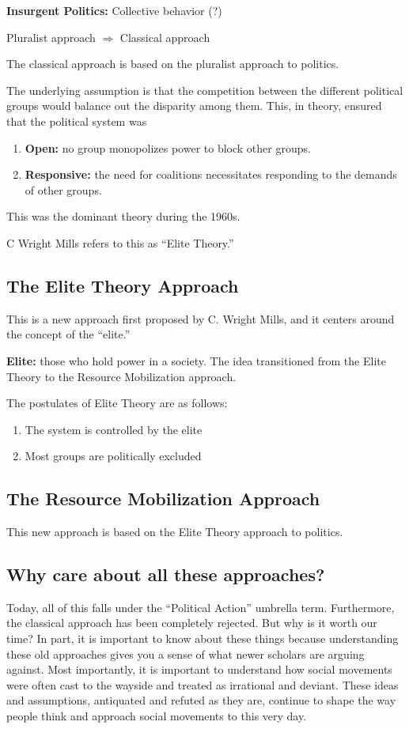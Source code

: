 \noindent \textbf{Insurgent Politics:} Collective behavior (?)

Pluralist approach $\Rightarrow$ Classical approach

The classical approach is based on the pluralist approach to politics.


The underlying assumption is that the competition between the different political groups would balance out the disparity among them.
This, in theory, ensured that the political system was
\begin{enumerate}
    \item \textbf{Open:} no group monopolizes power to block other groups.
    \item \textbf{Responsive:} the need for coalitions necessitates responding to the demands of other groups.
\end{enumerate}

This was the dominant theory during the 1960s.

C Wright Mills refers to this as ``Elite Theory.''

\subsection{The Elite Theory Approach}
This is a new approach first proposed by C. Wright Mills, and it centers around the concept of the ``elite.''

\noindent \textbf{Elite:} those who hold power in a society.
The idea transitioned from the Elite Theory to the Resource Mobilization approach.

The postulates of Elite Theory are as follows:
\begin{enumerate}
    \item The system is controlled by the elite
    \item Most groups are politically excluded
\end{enumerate}

\subsection{The Resource Mobilization Approach}
This new approach is based on the Elite Theory approach to politics. 

\subsection{Why care about all these approaches?}
Today, all of this falls under the ``Political Action'' umbrella term.
Furthermore, the classical approach has been completely rejected.
But why is it worth our time?
In part, it is important to know about these things because understanding these old approaches gives you a sense of what newer scholars are arguing against.
Most importantly, it is important to understand how social movements were often cast to the wayside and treated as irrational and deviant.
These ideas and assumptions, antiquated and refuted as they are, continue to shape the way people think and approach social movements to this very day.


